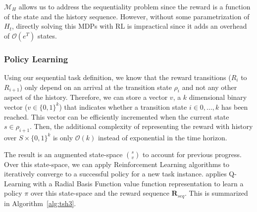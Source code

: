 $\mathcal{M}_H$ allows us to address the sequentiality problem since the reward is a function of the state and the history sequence.
However, without some parametrization of $H_t$, directly solving this MDPs with RL is impractical since it adds an overhead of $\mathcal{O}(e^{T})$ states.

\vspace{-15pt}
\subsubsection{Policy Learning}
Using our sequential task definition, we know that the reward transitions ($R_{i}$ to $R_{i+1}$) only depend on an arrival at the transition state $\rho_{i}$ and not any other aspect of the history.
Therefore, we can store a vector $v$, a $k$ dimensional binary vector ($v \in \{0,1\}^k$) that indicates whether a transition state $i \in 0,...,k$ has been reached.
This vector can be efficiently incremented when the current state $s \in \rho_{i+1}$.
Then, the additional complexity of representing the reward with history over $S \times  \{0,1\}^k$ is only $\mathcal{O}(k)$ instead of exponential in the time horizon.

The result is an augmented state-space $\binom{s}{v}$ to account for previous progress.
Over this state-space, we can apply Reinforcement Learning algorithms to iteratively converge to a successful policy for a new task instance.
\hirl applies Q-Learning with a Radial Basis Function value function representation to learn a policy $\pi$ over this state-space and the reward sequence $\mathbf{R}_{seq}$.
This is summarized in Algorithm~\ref{alg:tsh3}.
